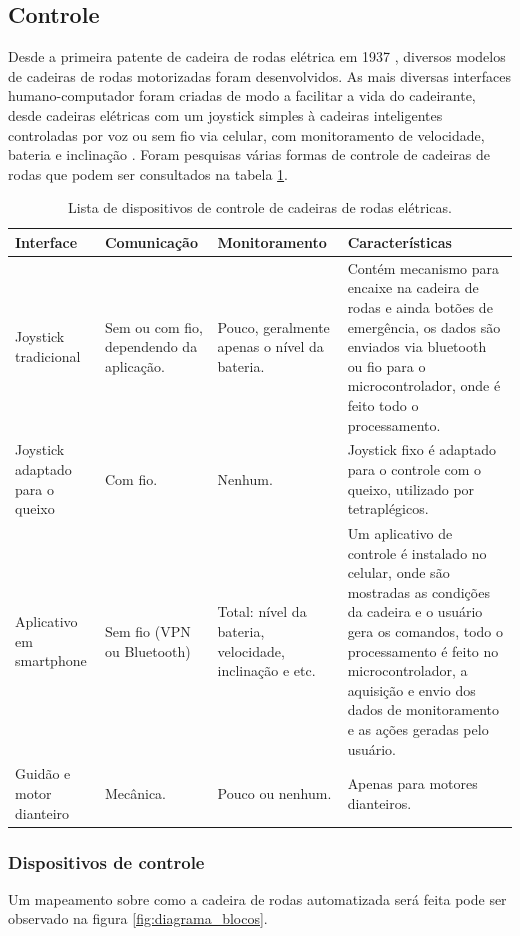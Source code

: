 \subsection{Controle}

Desde a primeira patente de cadeira de rodas elétrica em 1937 \cite{patent_cadeira_rodas_eletrica}, diversos modelos de cadeiras de rodas motorizadas foram desenvolvidos. As mais diversas interfaces humano-computador foram criadas de modo a facilitar a vida do cadeirante, desde cadeiras elétricas com um joystick simples à cadeiras inteligentes controladas por voz ou sem fio via celular, com monitoramento de velocidade, bateria e inclinação \cite{artigo_controle_cadeira_eletrica}. Foram pesquisas várias formas de controle de cadeiras de rodas que podem ser consultados na tabela \ref{tab:interfaces}.

\begin{table}[!htb]
\centering
\begin{tabular}{|p{2cm}|p{3cm}|p{3cm}|p{4cm}|}
\hline
Interface & Comunicação & Monitoramento & Características \\ \hline
Joystick tradicional & Sem ou com fio, dependendo da aplicação. & Pouco, geralmente apenas o nível da bateria. & Contém mecanismo para encaixe na cadeira de rodas e ainda botões de emergência, os dados são enviados via bluetooth ou fio para o microcontrolador, onde é feito todo o processamento. \\ \hline
Joystick adaptado para o queixo & Com fio. & Nenhum. & Joystick fixo é adaptado para o controle com o queixo, utilizado por tetraplégicos. \\ \hline
Aplicativo em smartphone & Sem fio (VPN ou Bluetooth) & Total: nível da bateria, velocidade, inclinação e etc. & Um aplicativo de controle é instalado no celular, onde são mostradas as condições da cadeira e o usuário gera os comandos, todo o processamento é feito no microcontrolador, a aquisição e envio dos dados de monitoramento e as ações geradas pelo usuário. \\ \hline
Guidão e motor dianteiro & Mecânica. & Pouco ou nenhum. & Apenas para motores dianteiros. \\ \hline
\end{tabular}
\caption{Lista de dispositivos de controle de cadeiras de rodas elétricas.}
\label{tab:interfaces}
\end{table}

 \subsubsection{Dispositivos de controle}
Um mapeamento sobre como a cadeira de rodas automatizada será feita pode ser observado na figura \ref{fig:diagrama_blocos}.

